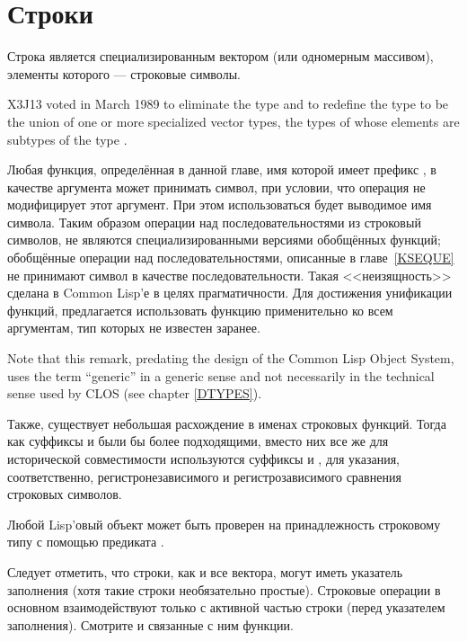 \else

\chapter{Строки}
\def\pagestatus{FINAL PROOF}

Строка является специализированным вектором (или одномерным массивом), элементы
которого --- строковые символы.

\begin{newer}
X3J13 voted in March 1989 
to eliminate the type  and to redefine the type
 to be the union of one or more specialized vector
types, the types of whose elements are subtypes of the type .
\end{newer}

Любая функция, определённая в данной главе, имя которой имеет префикс
, в качестве аргумента может принимать символ, при
условии, что операция не модифицирует этот аргумент.
При этом использоваться будет выводимое имя символа.
Таким образом операции над последовательностями из строковый символов, не
являются специализированными версиями обобщённых функций; обобщённые операции
над последовательностями, описанные в главе~\ref{KSEQUE} не принимают символ в
качестве последовательности. Такая <<неизящность>> сделана в Common Lisp'е в
целях прагматичности. Для достижения унификации функций, предлагается использовать
функцию  применительно ко всем аргументам, тип которых не известен заранее.

\begin{new}
Note that this remark, predating the design of the Common Lisp Object System,
uses the term ``generic'' in a generic sense and not necessarily
in the technical sense used by CLOS
(see chapter \ref{DTYPES}).
\end{new}

Также, существует небольшая расхождение в именах строковых функций.
Тогда как суффиксы  и  были бы более подходящими, вместо
них все же для исторической совместимости используются суффиксы  и
\cdf{=}, для указания, соответственно, регистронезависимого и регистрозависимого
сравнения строковых символов.

Любой Lisp'овый объект может быть проверен на принадлежность строковому типу с
помощью предиката .

Следует отметить, что строки, как и все вектора, могут иметь указатель
заполнения (хотя такие строки необязательно простые).
Строковые операции в основном взаимодействуют только с активной частью строки
(перед указателем заполнения). Смотрите  и связанные с ним
функции.

